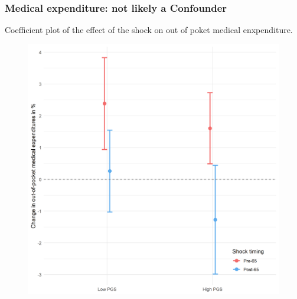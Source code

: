 \documentclass[10pt,compress,xcolor=dvipsnames]{beamer}    %
\newcounter{ex}
\newcommand{\1}[1]{\mathrm{1\hspace*{-2.5pt}l}[#1]}	%
\begin{document}
\begin{frame}
\frametitle{Medical expenditure: not likely a Confounder}
Coefficient plot of the effect of the shock on out of poket medical enxpenditure.
\begin{figure}[hbtp]
\centering
\includegraphics[height=0.8\textheight]{../../3_output/shock_effects/medexp_6070_100_cvplot.png}
\label{fig:medexp}
\end{figure}
\end{frame}

\end{document}
